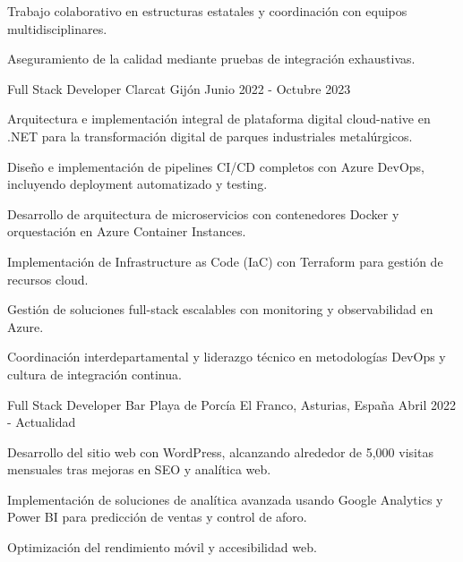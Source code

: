 \begin{cventries}
{\begin{cvitems}
            \item {Trabajo colaborativo en estructuras estatales y coordinación con equipos multidisciplinares.}
            \item {Aseguramiento de la calidad mediante pruebas de integración exhaustivas.}
        \end{cvitems}
    }
    \cventry
    {Full Stack Developer} %
    {Clarcat} %
    {Gijón} %
    {Junio 2022 - Octubre 2023} %
    {
        \begin{cvitems}
            \item {Arquitectura e implementación integral de plataforma digital cloud-native en .NET para la transformación digital de parques industriales metalúrgicos.}
            \item {Diseño e implementación de pipelines CI/CD completos con Azure DevOps, incluyendo deployment automatizado y testing.}
            \item {Desarrollo de arquitectura de microservicios con contenedores Docker y orquestación en Azure Container Instances.}
            \item {Implementación de Infrastructure as Code (IaC) con Terraform para gestión de recursos cloud.}
            \item {Gestión de soluciones full-stack escalables con monitoring y observabilidad en Azure.}
            \item {Coordinación interdepartamental y liderazgo técnico en metodologías DevOps y cultura de integración continua.}
        \end{cvitems}
    }
    \cventry
    {Full Stack Developer} %
    {Bar Playa de Porcía} %
    {El Franco, Asturias, España} %
    {Abril 2022 - Actualidad} %
    {
        \begin{cvitems}
            \item {Desarrollo del sitio web con WordPress, alcanzando alrededor de 5,000 visitas mensuales tras mejoras en SEO y analítica web.}
            \item {Implementación de soluciones de analítica avanzada usando Google Analytics y Power BI para predicción de ventas y control de aforo.}
            \item {Optimización del rendimiento móvil y accesibilidad web.}
        \end{cvitems}
    }

\end{cventries}

